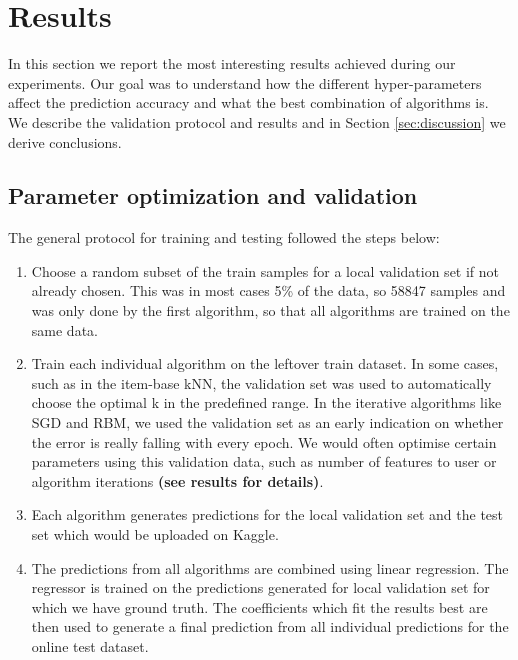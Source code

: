 \documentclass[10pt,conference,compsocconf]{IEEEtran}
\begin{document}
\section{Results}
\label{sec:results}
In this section we report the most interesting results achieved during our experiments. Our goal was to understand how the different hyper-parameters affect the prediction accuracy and what the best combination of algorithms is. We describe the validation protocol and results and in Section \ref{sec:discussion} we derive conclusions.
\subsection{Parameter optimization and validation} 
The general protocol for training and testing followed the steps below:

\begin{enumerate}
\item Choose a random subset of the train samples for a local validation set if not already chosen. This was in most cases 5\% of the data, so 58847 samples and was only done by the first algorithm, so that all algorithms are trained on the same data.

\item Train each individual algorithm on the leftover train dataset. In some cases, such as in the item-base kNN, the validation set was used to automatically choose the optimal k in the predefined range. In the iterative algorithms like SGD and RBM, we used the validation set as an early indication on whether the error is really falling with every epoch. We would often optimise certain parameters using this validation data, such as number of features to user or algorithm iterations \textbf{(see results for details)}.

\item Each algorithm generates predictions for the local validation set and the test set which would be uploaded on Kaggle.

\item The predictions from all algorithms are combined using linear regression. The regressor is trained on the predictions generated for local validation set for which we have ground truth. The coefficients which fit the results best are then used to generate a final prediction from all individual predictions for the online test dataset.

\end{enumerate}
\end{document}

